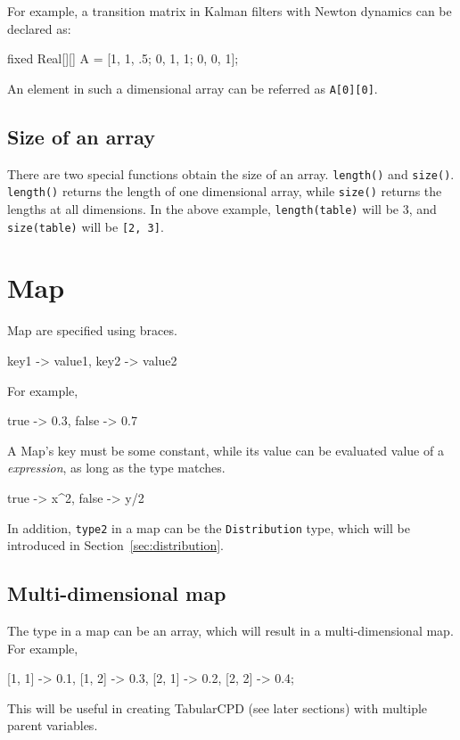 \documentclass[12pt]{article}
\begin{document}
For example, a transition matrix in Kalman  filters with Newton dynamics can be declared as:
\begin{blogcode}
fixed Real[][] A = [1, 1, .5; 0, 1, 1; 0, 0, 1];
\end{blogcode}
An element in such a dimensional array can be referred as \texttt{A[0][0]}.

\subsection{Size of an array}
There are two special functions obtain the size of an array.
\texttt{length(\mycdot)} and \texttt{size(\mycdot)}.
\texttt{length(\mycdot)} returns the length of one dimensional array, while \texttt{size(\mycdot)} returns the lengths at all dimensions.
In the above example, \texttt{length(table)} will be 3, and \texttt{size(table)} will be \texttt{[2, 3]}.

\section{Map}
Map are specified using braces. 
\begin{blogcode}
{key1 -> value1, key2 -> value2}
\end{blogcode}

For example, 
\begin{blogcode}
 {true -> 0.3, false -> 0.7}
\end{blogcode}

A Map's key must be some constant, while its value can be evaluated value of a \emph{expression}, as long as the type matches.
\begin{blogcode}
{true -> x^2, false -> y/2}
\end{blogcode}

In addition, \texttt{type2}  in a map can be the \texttt{Distribution} type, which will be introduced in Section~\ref{sec:distribution}.

\subsection{Multi-dimensional map}
The type in a map can be an array, which will result in a multi-dimensional map.
For example,
\begin{blogcode}
{[1, 1] -> 0.1, [1, 2] -> 0.3, [2, 1] -> 0.2, [2, 2] -> 0.4};
\end{blogcode}

This will be useful in creating TabularCPD (see later sections) with multiple parent variables.
\end{document}
